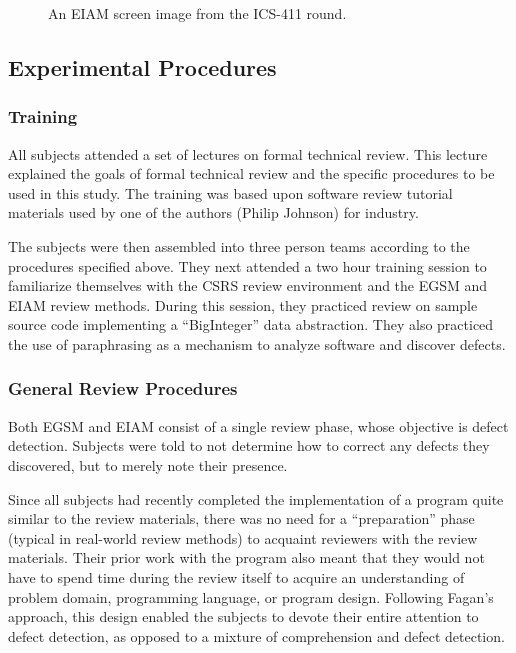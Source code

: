 \begin{figure}[htb]
 {\centerline{}}
 \caption{An EIAM screen image from the ICS-411 round.}
 \label{fig:eiam-screen}
\end{figure}


\subsection{Experimental Procedures}

\subsubsection{Training}

All subjects attended a set of lectures on formal technical review. This
lecture explained the goals of formal technical review and the specific
procedures to be used in this study.  The training was based upon software
review tutorial materials used by one of the authors (Philip Johnson) for industry. 

The subjects were then assembled into three person teams according to the
procedures specified above. They next attended a two hour training session
to familiarize themselves with the CSRS review environment and the EGSM and
EIAM review methods. During this session, they practiced review on sample
source code implementing a ``BigInteger'' data abstraction. They also
practiced the use of paraphrasing as a mechanism to analyze software and
discover defects.

\subsubsection{General Review Procedures}

Both EGSM and EIAM consist of a single review phase, whose objective is
defect detection.  Subjects were told to not determine how to correct any
defects they discovered, but to merely note their presence.  

Since all subjects had recently completed the implementation of a program
quite similar to the review materials, there was no need for a
``preparation'' phase (typical in real-world review methods) to acquaint
reviewers with the review materials. Their prior work with the
program also meant that they would not have to spend time during the review
itself to acquire an understanding of problem domain, programming language,
or program design. Following Fagan's approach, this design enabled the
subjects to devote their entire attention to defect detection, as opposed
to a mixture of comprehension and defect detection.

